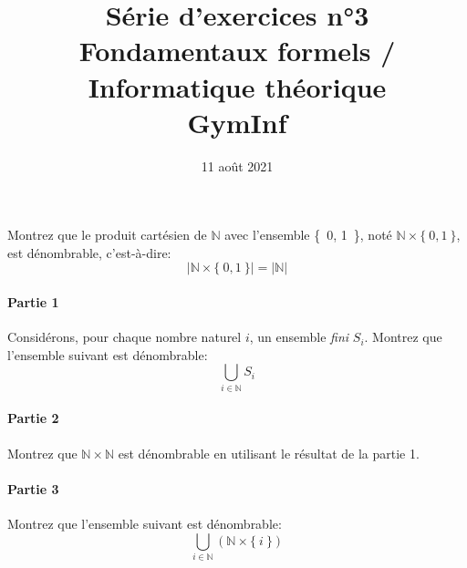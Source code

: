 \documentclass[12pt,french,a4paper]{article}
\begin{document}
\title{\vspace{-2cm}Série d'exercices n°3\\\large{Fondamentaux formels / Informatique théorique\\GymInf}}
\date{\vspace{-1cm}11 août 2021}

\maketitle

\begin{question}
Montrez que le produit cartésien de $\mathbb{N}$ avec l'ensemble \{\ 0, 1\ \}, noté $\mathbb{N} \times \{\ 0, 1\ \}$, est dénombrable, c'est-à-dire:
\[
|\mathbb{N} \times \{\ 0, 1\ \}| = |\mathbb{N}|
\]
\end{question}

\begin{question}
\paragraph{Partie 1}
Considérons, pour chaque nombre naturel $i$, un ensemble \textit{fini} $S_i$.
Montrez que l'ensemble suivant est dénombrable:
\[
\bigcup_{i \in \mathbb{N}} S_i
\]

\paragraph{Partie 2}
Montrez que $\mathbb{N} \times \mathbb{N}$ est dénombrable en utilisant le résultat de la partie 1.

\paragraph{Partie 3}
Montrez que l'ensemble suivant est dénombrable:
\[
\bigcup_{i \in \mathbb{N}} (\mathbb{N} \times \{\ i\ \})
\]
\end{question}
\end{document}
